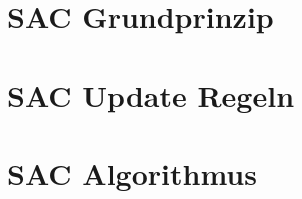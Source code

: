 \section{SAC Grundprinzip}

\begin{frame}{}

\end{frame}

\section{SAC Update Regeln}

\begin{frame}{}

\end{frame}

\section{SAC Algorithmus}

\begin{frame}{}

\end{frame}